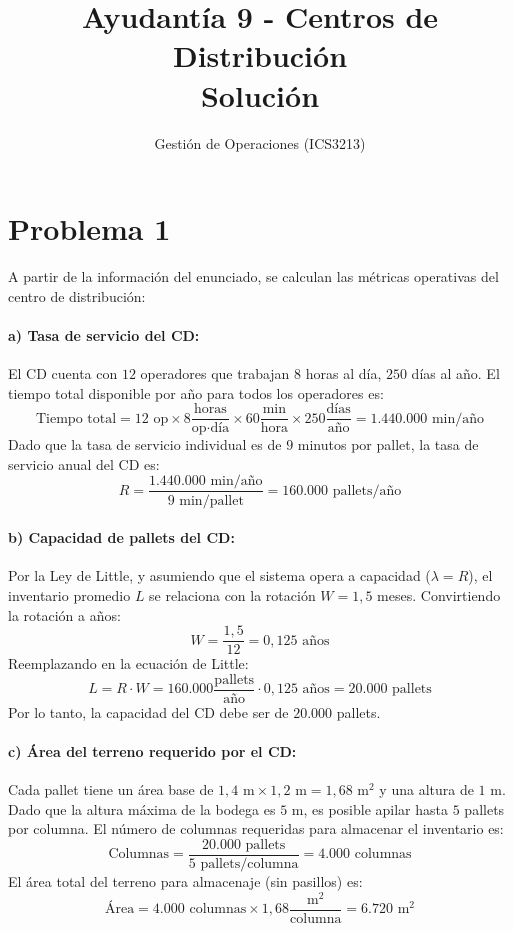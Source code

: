 \documentclass[11pt]{article}
\title{Ayudantía 9 - Centros de Distribución \\ \Large Solución}
\author{Gestión de Operaciones (ICS3213)}
\date{}
\begin{document}
\maketitle

\section*{Problema 1}

A partir de la información del enunciado, se calculan las métricas operativas del centro de distribución:

\paragraph{a) Tasa de servicio del CD:}
El CD cuenta con $12$ operadores que trabajan $8$ horas al día, $250$ días al año. 
El tiempo total disponible por año para todos los operadores es:
$$ \text{Tiempo total} = 12 \text{ op} \times 8 \frac{\text{horas}}{\text{op}\cdot\text{día}} \times 60 \frac{\text{min}}{\text{hora}} \times 250 \frac{\text{días}}{\text{año}} = 1.440.000 \text{ min/año} $$
Dado que la tasa de servicio individual es de $9$ minutos por pallet, la tasa de servicio anual del CD es:
$$ R = \frac{1.440.000 \text{ min/año}}{9 \text{ min/pallet}} = 160.000 \text{ pallets/año} $$

\paragraph{b) Capacidad de pallets del CD:}
Por la Ley de Little, y asumiendo que el sistema opera a capacidad ($ \lambda = R $), el inventario promedio $L$ se relaciona con la rotación $W = 1,5$ meses. Convirtiendo la rotación a años:
$$ W = \frac{1,5}{12} = 0,125 \text{ años} $$
Reemplazando en la ecuación de Little:
$$ L = R \cdot W = 160.000 \frac{\text{pallets}}{\text{año}} \cdot 0,125 \text{ años} = 20.000 \text{ pallets} $$
Por lo tanto, la capacidad del CD debe ser de $20.000$ pallets.

\paragraph{c) Área del terreno requerido por el CD:}
Cada pallet tiene un área base de $1,4 \text{ m} \times 1,2 \text{ m} = 1,68 \text{ m}^2$ y una altura de $1 \text{ m}$.
Dado que la altura máxima de la bodega es $5 \text{ m}$, es posible apilar hasta $5$ pallets por columna.
El número de columnas requeridas para almacenar el inventario es:
$$ \text{Columnas} = \frac{20.000 \text{ pallets}}{5 \text{ pallets/columna}} = 4.000 \text{ columnas} $$
El área total del terreno para almacenaje (sin pasillos) es:
$$ \text{Área} = 4.000 \text{ columnas} \times 1,68 \frac{\text{m}^2}{\text{columna}} = 6.720 \text{ m}^2 $$
\end{document}
